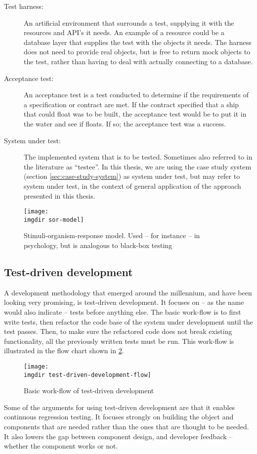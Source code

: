 \begin{description}
  \item[Test harness:] An artificial environment that surrounds a test, supplying it with the resources and API's it needs. An example of a resource could be a database layer that supplies the test with the objects it needs. The harness does not need to provide real objects, but is free to return mock objects to the test, rather than having to deal with actually connecting to a database.

  \item[Acceptance test:] An acceptance test is a test conducted to determine if the requirements of a specification or contract are met. If the contract specified that a ship that could float was to be built, the acceptance test would be to put it in the water and see if floats. If so; the acceptance test was a success.
  
  \item[System under test:] The implemented system that is to be tested. Sometimes also referred to in the literature as ``testee''. In this thesis, we are using the case study system (section \ref{sec:case-study-system}) as system under test, but may refer to system under test, in the context of general application of the approach presented in this thesis.
\end{description}
\begin{figure}[!htbp]
  \centering
  \texttt{[image: \\imgdir sor-model]}
  \caption{Stimuli-organism-response model. Used -- for instance -- in psychology, but is analogous to black-box testing}
  \label{fig:sor-model}
\end{figure}
\subsection{Test-driven development}
\label{ssec:test-driven-development}
A development methodology that emerged around the millennium, and have been looking very promising, is test-driven development. It focuses on -- as the name would also indicate -- tests before anything else. The basic work-flow is to first write tests, then refactor the code base of the system under development until the test passes. Then, to make sure the refactored code does not break existing functionality, all the previously written tests must be run. This work-flow is illustrated in the flow chart shown in \ref{fig:test-driven-development-flow}.\medskip
\begin{figure}[!htbp]
\centering
\texttt{[image: \\imgdir test-driven-development-flow]}
\caption{Basic work-flow of test-driven development}
\label{fig:test-driven-development-flow}
\end{figure}
\noindent Some of the arguments for using test-driven development are that it enables continuous regression testing. It focuses strongly on building the object and components that are needed rather than the ones that are thought to be needed. It also lowers the gap between component design, and developer feedback -- whether the component works or not\cite{george2003}.

